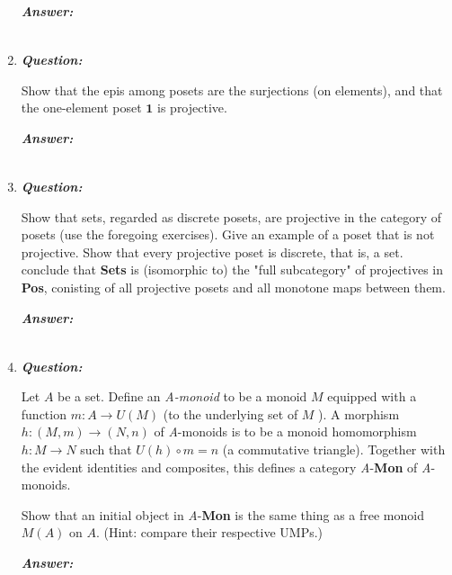 \documentclass{article}
\begin{document}
\begin{enumerate}
	      \textbf{\textit{Answer:}}

	      \begin{align*}
	      \end{align*}


	\item
	      \textbf{\textit{Question:}}

	      Show that the epis among posets are the surjections (on elements), and that the one-element poset $ \textbf{1}  $ is projective.

	      \textbf{\textit{Answer:}}

	      \begin{align*}
	      \end{align*}


	\item
	      \textbf{\textit{Question:}}

	      Show that sets, regarded as discrete posets, are projective in the category of posets (use the foregoing exercises). Give an example of a poset that is not projective. Show that every projective poset is discrete, that is, a set. conclude that \textbf{Sets} is (isomorphic to) the "full subcategory" of projectives in \textbf{Pos}, conisting of all projective posets and all monotone maps between them.

	      \textbf{\textit{Answer:}}

	      \begin{align*}
	      \end{align*}


	\item
	      \textbf{\textit{Question:}}

	      Let $ A $ be a set. Define an \textit{A-monoid} to be a monoid $ M $ equipped with a function $ m : A \to U(M) $ (to the underlying set of $ M $ ). A morphism $ h : (M,m) \to (N,n) $ of \textit{A}-monoids is to be a monoid homomorphism $ h : M \to N $ such that $ U(h) \circ m = n $ (a commutative triangle). Together with the evident identities and composites, this defines a category \textit{A}-\textbf{Mon} of \textit{A}-monoids.

	      Show that an initial object in \textit{A}-\textbf{Mon} is the same thing as a free monoid $ M(A) $ on $ A $. (Hint: compare their respective UMPs.)

	      \textbf{\textit{Answer:}}

	      \begin{align*}
	      \end{align*}



\end{enumerate}
\end{document}

